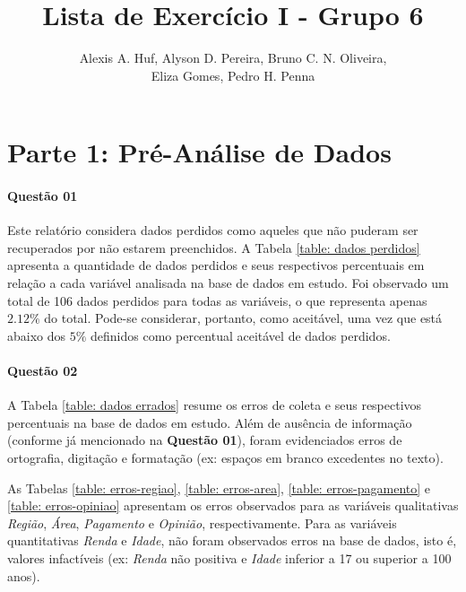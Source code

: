 \documentclass[10pt,a4paper,oneside]{article}
\author{%
	Alexis A. Huf, %
	Alyson D. Pereira, %
	Bruno C. N. Oliveira,\\%
	Eliza Gomes, %
	Pedro H. Penna
	}
\title{Lista de Exercício I - Grupo 6}
\begin{document}
\maketitle

\section*{Parte 1: Pré-Análise de Dados}

\paragraph{Questão 01}

Este relatório considera dados perdidos como aqueles que não puderam ser recuperados por não estarem preenchidos. A Tabela \ref{table: dados perdidos} apresenta a quantidade de dados perdidos e seus respectivos percentuais em relação a cada variável analisada na base de dados em estudo. Foi observado um total de 106 dados perdidos para todas as variáveis, o que representa apenas $2.12\%$ do total. Pode-se considerar, portanto, como aceitável, uma vez que está abaixo dos $5\%$ definidos como percentual aceitável de dados perdidos.



\paragraph{Questão 02}

A Tabela \ref{table: dados errados} resume os erros de coleta e seus respectivos percentuais na base de dados em estudo. Além de ausência de informação (conforme já mencionado na \textbf{Questão 01}), foram evidenciados erros de ortografia, digitação e formatação (ex: espaços em branco excedentes no texto). 

As Tabelas \ref{table: erros-regiao}, \ref{table: erros-area}, \ref{table: erros-pagamento} e \ref{table: erros-opiniao} apresentam os erros observados para as variáveis qualitativas \textit{Região}, \textit{Área}, \textit{Pagamento} e \textit{Opinião}, respectivamente.
Para as variáveis quantitativas \textit{Renda} e \textit{Idade}, não foram observados erros na base de dados, isto é, valores infactíveis (ex: \textit{Renda} não positiva e \textit{Idade} inferior a 17 ou superior a 100 anos).
\end{document}
